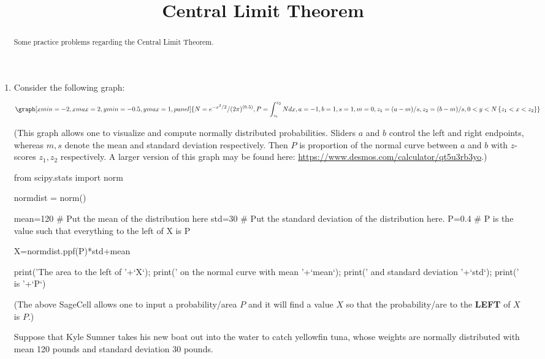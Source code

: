 \documentclass{ximera}
\title{Central Limit Theorem}
\begin{document}
    
 \begin{abstract}
 Some practice problems regarding the Central Limit Theorem.
 \end{abstract}   
    
      
      
\maketitle
      
 
\begin{enumerate}

\item Consider the following graph:

\begin{onlineOnly}
$$\graph[xmin=-2,xmax=2,ymin=-0.5,ymax=1, panel]{N=e^{-x^2/2}/(2\pi)^{(0.5)}, P=\int_{z_1}^{z_2} N dx, a=-1, b=1, s=1, m=0, z_1=(a-m)/s, z_2=(b-m)/s, 0<y<N\left\{z_1<x<z_2\right\}}$$
\end{onlineOnly}
(This graph allows one to visualize and compute normally distributed probabilities.  Sliders $a$ and $b$ control the left and right endpoints, whereas $m, s$ denote the mean and standard deviation respectively.  Then $P$ is proportion of the normal curve between $a$ and $b$ with $z$-scores $z_1, z_2$ respectively.  A larger version of this graph may be found here: \url{https://www.desmos.com/calculator/qt5u3rb3yo}.)


\begin{sageCell}
from scipy.stats import norm

normdist = norm()

mean=120 # Put the mean of the distribution here
std=30  # Put the standard deviation of the distribution here.
P=0.4  # P is the value such that everything to the left of X is P

X=normdist.ppf(P)*std+mean

print('The area to the left of '+`X`); print(' on the normal curve with mean '+`mean`); print(' and standard deviation '+`std`); print(' is  '+`P`)
\end{sageCell}
(The above SageCell allows one to input a probability/area $P$ and it will find a value $X$ so that the probability/are to the \textbf{LEFT} of $X$ is $P$.)



\begin{problem}
Suppose that Kyle Sumner takes his new boat out into the water to catch yellowfin tuna, whose weights are normally distributed with mean 120 pounds and standard deviation 30 pounds.  


\end{problem}
\end{enumerate}
\end{document}
